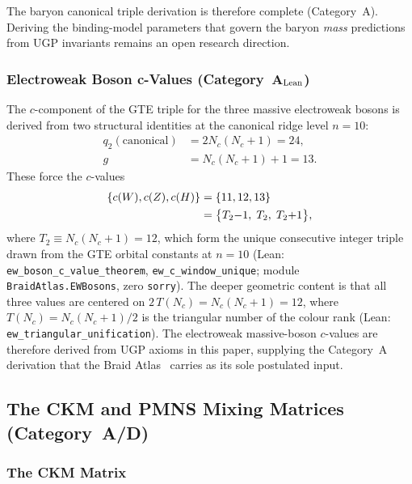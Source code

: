 \documentclass[11pt]{article}
\theoremstyle{remark}
\begin{document}
The baryon canonical triple derivation is therefore complete (Category~A).
Deriving the binding-model parameters that govern the baryon \emph{mass} predictions from UGP invariants remains an open research direction.

\subsubsection{Electroweak Boson c-Values (Category~A$_{\rm Lean}$)}
\label{subsec:ew_cvalues}

The $c$-component of the GTE triple for the three massive electroweak bosons is derived from two structural identities at the canonical ridge level $n{=}10$:
\begin{align}
q_2(\text{canonical}) &= 2N_c(N_c{+}1) = 24, \label{eq:ew_q2}\\
g &= N_c(N_c{+}1) + 1 = 13. \label{eq:ew_g}
\end{align}
These force the $c$-values
\begin{align}
\{c(W), c(Z), c(H)\} &= \{11, 12, 13\} \notag\\
 &= \bigl\{T_2{-}1,\; T_2,\; T_2{+}1\bigr\},
\label{eq:ew_cvals}
\end{align}
where $T_2 \equiv N_c(N_c{+}1) = 12$,
which form the unique consecutive integer triple drawn from the GTE orbital constants at $n{=}10$
(Lean: \texttt{ew\_boson\_c\_value\_theorem},
\texttt{ew\_c\_window\_unique}; module \texttt{BraidAtlas.EWBosons}, zero \texttt{sorry}).
The deeper geometric content is that all three values are centered on $2\,T(N_c) = N_c(N_c{+}1) = 12$, where $T(N_c) = N_c(N_c{+}1)/2$ is the triangular number of the colour rank (Lean: \texttt{ew\_triangular\_unification}).
The electroweak massive-boson $c$-values are therefore derived from UGP axioms in this paper, supplying the Category~A derivation that the Braid Atlas~\cite{SpivackBraidAtlas} carries as its sole postulated input.

\subsection{The CKM and PMNS Mixing Matrices (Category~A/D)}\label{sec:mixing_ext}


\subsubsection{The CKM Matrix}
\label{subsec:ckm}
\end{document}
